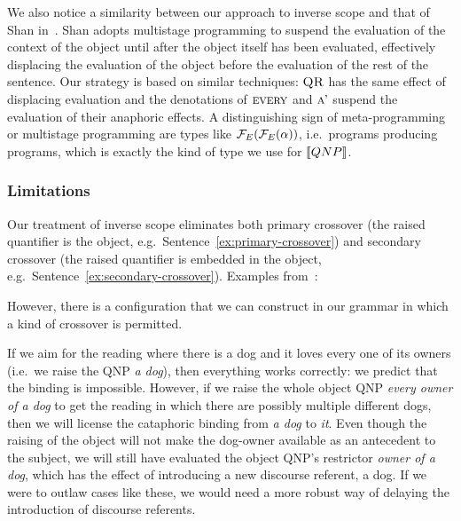 We also notice a similarity between our approach to inverse scope and that
of Shan in~\cite{shan2007inverse}. Shan adopts multistage programming to
suspend the evaluation of the context of the object until after the object
itself has been evaluated, effectively displacing the evaluation of the
object before the evaluation of the rest of the sentence. Our strategy is
based on similar techniques: $\textsc{QR}$ has the same effect of displacing
evaluation and the denotations of $\textsc{every}$ and $\textsc{a'}$ suspend the
evaluation of their anaphoric effects. A distinguishing sign of
meta-programming or multistage programming are types like
$\mathcal{F}_E(\mathcal{F}_E(\alpha))$, i.e.\ programs producing programs, which is exactly
the kind of type we use for $\llbracket QNP \rrbracket$.


\subsubsection{Limitations}

Our treatment of inverse scope eliminates both primary crossover (the
raised quantifier is the object, e.g.\ Sentence~\ref{ex:primary-crossover})
and secondary crossover (the raised quantifier is embedded in the object,
e.g.\ Sentence~\ref{ex:secondary-crossover}). Examples
from~\cite{shan2006explaining}:

\begin{exe}
\end{exe}

However, there is a configuration that we can construct in our grammar in
which a kind of crossover is permitted.

\begin{exe}
\end{exe}

If we aim for the reading where there is a dog and it loves every one of
its owners (i.e.\ we raise the QNP \emph{a dog}), then everything works
correctly: we predict that the binding is impossible. However, if we raise
the whole object QNP \emph{every owner of a dog} to get the reading in
which there are possibly multiple different dogs, then we will license the
cataphoric binding from \emph{a dog} to \emph{it}. Even though the raising
of the object will not make the dog-owner available as an antecedent to the
subject, we will still have evaluated the object QNP's restrictor
\emph{owner of a dog}, which has the effect of introducing a new discourse
referent, a dog. If we were to outlaw cases like these, we would need a
more robust way of delaying the introduction of discourse referents.
